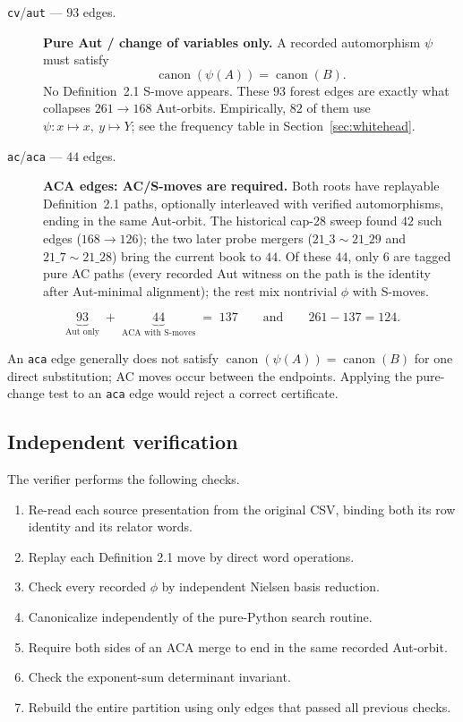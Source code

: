 \documentclass[11pt]{article}
\theoremstyle{definition}
\theoremstyle{remark}
\newcommand{\canon}{\operatorname{canon}}
\begin{document}
\begin{description}
  \item[\texttt{cv}/\texttt{aut} --- \(93\) edges.]
  \textbf{Pure Aut / change of variables only.}  A recorded automorphism
  \(\psi\) must satisfy
  \[
    \canon(\psi(A))=\canon(B).
  \]
  No Definition~2.1 S-move appears.  These \(93\) forest edges are exactly
  what collapses \(261\to168\) Aut-orbits.  Empirically, \(82\) of them use
  \(\psi\colon x\mapsto x,\ y\mapsto Y\); see the frequency table in
  Section~\ref{sec:whitehead}.

  \item[\texttt{ac}/\texttt{aca} --- \(44\) edges.]
  \textbf{ACA edges: AC/S-moves are required.}  Both roots have replayable
  Definition~2.1 paths, optionally interleaved with verified automorphisms,
  ending in the same Aut-orbit.  The historical cap-28 sweep found \(42\)
  such edges (\(168\to126\)); the two later probe mergers
  (\(21\_3\sim 21\_29\) and \(21\_7\sim 21\_28\)) bring the current book to
  \(44\).  Of these \(44\), only \(6\) are tagged pure AC paths (every
  recorded Aut witness on the path is the identity after Aut-minimal
  alignment); the rest mix nontrivial \(\phi\) with S-moves.
\end{description}

\[
  \underbrace{93}_{\text{Aut only}}
  \;+\;
  \underbrace{44}_{\text{ACA with S-moves}}
  \;=\;
  137
  \qquad\text{and}\qquad
  261-137=124.
\]

An \texttt{aca} edge generally does not satisfy
\(\canon(\psi(A))=\canon(B)\) for one direct substitution; AC moves occur
between the endpoints.  Applying the pure-change test to an \texttt{aca}
edge would reject a correct certificate.

\subsection{Independent verification}

The verifier performs the following checks.

\begin{enumerate}
  \item Re-read each source presentation from the original CSV, binding
  both its row identity and its relator words.
  \item Replay each Definition 2.1 move by direct word operations.
  \item Check every recorded \(\phi\) by independent Nielsen basis
  reduction.
  \item Canonicalize independently of the pure-Python search routine.
  \item Require both sides of an ACA merge to end in the same recorded
  Aut-orbit.
  \item Check the exponent-sum determinant invariant.
  \item Rebuild the entire partition using only edges that passed all
  previous checks.
\end{enumerate}
\end{document}
